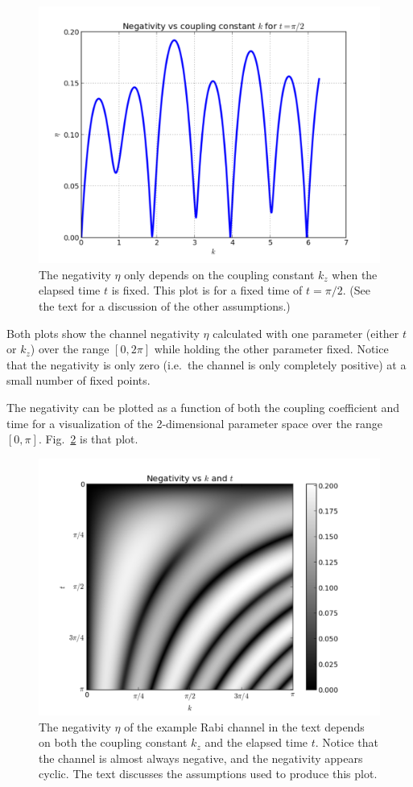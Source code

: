 \begin{figure}[th]
\includegraphics[scale=0.75]{figure2.pdf}
 \caption{The negativity $\eta$ only depends on  the coupling constant $k_z$ when the elapsed time $t$ is fixed.  This plot is for a fixed time of $t=\pi/2$.  (See the text for a discussion of the other assumptions.)}
\label{fig:IIplot2}
 \end{figure}
Both plots show the channel negativity $\eta$ calculated with one parameter (either $t$ or $k_z$) over the range $[0,2\pi]$ while holding the other parameter fixed.  Notice that the negativity is only zero (i.e.\ the channel is only completely positive) at a small number of fixed points.
 
The negativity can be plotted as a function of both the coupling coefficient and time for a visualization of the 2-dimensional parameter space over the range $[0,\pi]$.  Fig.\ \ref{fig:IIIplot3} is that plot.
\begin{figure}[th]
\includegraphics[scale=0.75]{figure3.pdf}
\caption{The negativity $\eta$ of the example Rabi channel in the text depends on both the coupling constant $k_z$ and the elapsed time $t$.  Notice that the channel is almost always negative, and the negativity appears cyclic.  The text discusses the assumptions used to produce this plot.}
 \label{fig:IIIplot3}
\end{figure}

